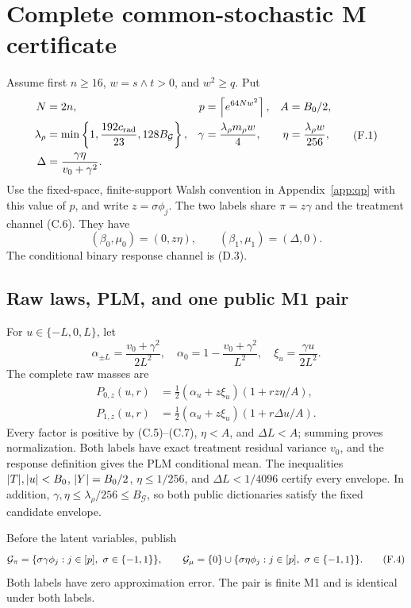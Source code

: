 \section{Complete common-stochastic M certificate}
\label{app:m}

Assume first \(n\ge16\), \(w=s\wedge t>0\), and \(w^2\ge q\).
Put
\[
\begin{aligned}
 N&=2n,& p&=\left\lceil e^{64Nw^2}\right\rceil,& A&=B_0/2,\\
 \lambda_\rho&=\min\left\{1,\frac{192c_{\rm rad}}{23},
                         128B_{\mathcal G}\right\},&
 \gamma&=\frac{\lambda_\rho m_\rho w}{4},&
 \eta&=\frac{\lambda_\rho w}{256},\\
 \Delta&=\frac{\gamma\eta}{v_0+\gamma^2}.
\end{aligned}
 \tag{F.1}
\]
Use the fixed-space, finite-support Walsh convention in Appendix~\ref{app:qp}
with this value of \(p\), and write \(z=\sigma\phi_j\).  The two labels share
\(\pi=z\gamma\) and the treatment channel (C.6).  They have
\[
 (\beta_0,\mu_0)=(0,z\eta),\qquad
 (\beta_1,\mu_1)=(\Delta,0).
 \tag{F.2}
\]
The conditional binary response channel is (D.3).

\subsection{Raw laws, PLM, and one public M1 pair}

For \(u\in\{-L,0,L\}\), let
\[
 \alpha_{\pm L}=\frac{v_0+\gamma^2}{2L^2},\quad
 \alpha_0=1-\frac{v_0+\gamma^2}{L^2},\quad
 \xi_u=\frac{\gamma u}{2L^2}.
\]
The complete raw masses are
\begin{align}
 P_{0,z}(u,r)&=\tfrac12(\alpha_u+z\xi_u)(1+rz\eta/A),\nonumber\\
 P_{1,z}(u,r)&=\tfrac12(\alpha_u+z\xi_u)(1+r\Delta u/A).
 \tag{F.3}
\end{align}
Every factor is positive by (C.5)--(C.7),
\(\eta<A\), and \(\Delta L<A\); summing proves normalization.
Both labels have exact treatment residual variance \(v_0\), and the response
definition gives the PLM conditional mean.  The inequalities
\(\lvert T\rvert,\lvert u\rvert<B_0\), \(\lvert Y\rvert=B_0/2\),
\(\eta\le1/256\), and \(\Delta L<1/4096\) certify every envelope.
In addition, \(\gamma,\eta\le\lambda_\rho/256\le B_{\mathcal G}\),
so both public dictionaries satisfy the fixed candidate envelope.

Before the latent variables, publish
\[
 \cG_\pi=\{\sigma\gamma\phi_j:j\in[p],\ \sigma\in\{-1,1\}\},\qquad
 \cG_\mu=\{0\}\cup
 \{\sigma\eta\phi_j:j\in[p],\ \sigma\in\{-1,1\}\}.
 \tag{F.4}
\]
Both labels have zero approximation error.  The pair is finite M1 and is
identical under both labels.

